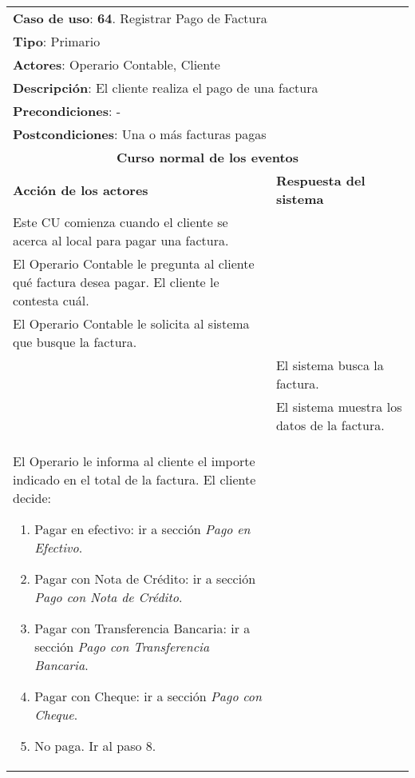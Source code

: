 \documentclass[12pt]{extarticle}
\begin{document}
	\begin{longtable}{ |p{8cm}|p{8cm}| }
		\hline
        \multicolumn{2}{|p{16cm}|}{\textbf{Caso de uso}: \textbf{64}. Registrar Pago de Factura}\\
		\multicolumn{2}{|p{16cm}|}{\textbf{Tipo}: Primario}\\
		\multicolumn{2}{|p{16cm}|}{\textbf{Actores}: Operario Contable, Cliente}\\
		\multicolumn{2}{|p{16cm}|}{\textbf{Descripción}: El cliente realiza el pago de una factura}\\
		\multicolumn{2}{|p{16cm}|}{\textbf{Precondiciones}: -}\\
		\multicolumn{2}{|p{16cm}|}{\textbf{Postcondiciones}: Una o más facturas pagas}\\
		\hline
		\multicolumn{2}{|c|}{\textbf{Curso normal de los eventos}}\\
		\hline
		\textbf{Acción de los actores} & \textbf{Respuesta del sistema}\\
		\hline
			\inc Este CU comienza cuando el cliente se acerca al local para pagar una factura.& \\
            \hline
			\inc El Operario Contable le pregunta al cliente qué factura desea pagar. El cliente le contesta cuál. & \\
            \hline
			\inc El Operario Contable le solicita al sistema que busque la factura. & \\
            \hline
			& \inc El sistema busca la factura. \\
            \hline
			& \inc El sistema muestra los datos de la factura. \\
            \hline
			\inc El Operario le informa al cliente el importe indicado en el total de la factura. El cliente decide:
                \begin{enumerate}[label=(\alph*)]
                    \item Pagar en efectivo: ir a sección \textit{Pago en Efectivo}.
                    \item Pagar con Nota de Crédito: ir a sección \textit{Pago con Nota de Crédito}.
                    \item Pagar con Transferencia Bancaria: ir a sección \textit{Pago con Transferencia Bancaria}.
                    \item Pagar con Cheque: ir a sección \textit{Pago con Cheque}.
                    \item No paga. Ir al paso 8.
                \end{enumerate}

\end{longtable}
\end{document}
